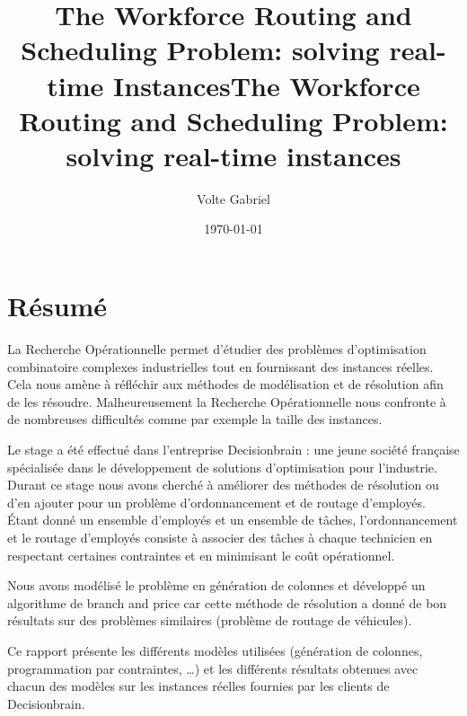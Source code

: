 \documentclass[]{report}
\title{The Workforce Routing and Scheduling Problem: solving real-time Instances}
\title{The Workforce Routing and Scheduling Problem: solving real-time instances}
\author{Volte Gabriel}
\date{\today}
\begin{document}
%
\section*{Résumé}


La Recherche Opérationnelle permet d’étudier des problèmes d'optimisation combinatoire complexes industrielles tout en fournissant des instances réelles.
Cela nous amène à réfléchir aux méthodes de modélisation et de résolution afin de les résoudre.
Malheureusement la Recherche Opérationnelle nous confronte à de nombreuses difficultés comme par exemple la taille des instances.

Le stage a été effectué dans l’entreprise Decisionbrain : une jeune société française spécialisée dans le développement de solutions d’optimisation pour l’industrie.
Durant ce stage nous avons cherché à améliorer des méthodes de résolution ou d'en ajouter pour un problème d'ordonnancement et de routage d'employés.
Étant donné un ensemble d’employés et un ensemble de tâches, l’ordonnancement et le routage d’employés consiste à associer des tâches à chaque technicien en respectant certaines contraintes et en minimisant le coût opérationnel.

Nous avons modélisé le problème en génération de colonnes et développé un algorithme de branch and price car cette méthode de résolution a donné de bon résultats sur des problèmes similaires (problème de routage de véhicules).

Ce rapport présente les différents modèles utilisées (génération de colonnes, programmation par contraintes, \ldots) et les différents résultats obtenues avec chacun des modèles sur les instances réelles fournies par les clients de Decisionbrain.
\end{document}
